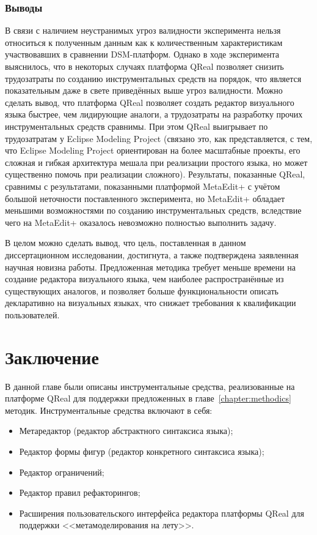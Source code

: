 \subsubsection{Выводы}
В связи с наличием неустранимых угроз валидности эксперимента нельзя относиться к полученным
данным как к количественным характеристикам участвовавших в сравнении DSM-платформ.
Однако в ходе эксперимента выяснилось, что в некоторых случаях платформа QReal позволяет снизить
трудозатраты по созданию инструментальных средств на порядок, что является показательным
даже в свете приведённых выше угроз валидности. Можно сделать вывод, что платформа
QReal позволяет создать редактор визуального языка быстрее, чем лидирующие аналоги,
а трудозатраты на разработку прочих инструментальных средств сравнимы. При этом QReal
выигрывает по трудозатратам у Eclipse Modeling Project (связано это, как представляется, 
с тем, что Eclipse Modeling Project ориентирован на более масштабные проекты, его
сложная и гибкая архитектура мешала при реализации простого языка, но может существенно
помочь при реализации сложного). Результаты, показанные QReal, сравнимы с результатами,
показанными платформой MetaEdit+ с учётом большой неточности поставленного эксперимента,
но MetaEdit+ обладает меньшими возможностями по созданию инструментальных средств, 
вследствие чего на MetaEdit+ оказалось невозможно полностью выполнить задачу.

В целом можно сделать вывод, что цель, поставленная в данном диссертационном исследовании, 
достигнута, а также подтверждена заявленная научная новизна работы. Предложенная 
методика требует меньше времени на создание редактора визуального языка, чем наиболее 
распространённые из существующих аналогов, и позволяет больше функциональности описать
декларативно на визуальных языках, что снижает требования к квалификации пользователей.

\section{Заключение}
В данной главе были описаны инструментальные средства, реализованные на платформе
QReal для поддержки предложенных в главе~\ref{chapter:methodics} методик. Инструментальные средства включают в себя:
\begin{itemize}
	\item Метаредактор (редактор абстрактного синтаксиса языка);
	\item Редактор формы фигур (редактор конкретного синтаксиса языка);
	\item Редактор ограничений;
	\item Редактор правил рефакторингов;
	\item Расширения пользовательского интерфейса редактора платформы QReal для поддержки
		<<метамоделирования на лету>>.
\end{itemize}


